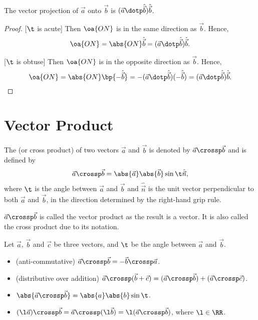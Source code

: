 \begin{proposition}
    The vector projection of $\vec a$ onto $\vec b$ is $(\vec a \dotp \hat{\vec b}) \hat{\vec b}$.
\end{proposition}
\begin{proof}
    [$\t$ is acute] Then $\oa{ON}$ is in the same direction as $\vec b$. Hence, \[\oa{ON} = \abs{ON} \hat{\vec b} = (\vec a \dotp \hat{\vec b}) \hat{\vec b}.\]

    [$\t$ is obtuse] Then $\oa{ON}$ is in the opposite direction as $\vec b$. Hence, \[\oa{ON} = \abs{ON} \bp{-\hat{\vec b}} = -(\vec a \dotp \hat{\vec b}) (-\hat{\vec b}) = (\vec a \dotp \hat{\vec b}) \hat{\vec b}.\]
\end{proof}

\section{Vector Product}

\begin{definition}
    The  (or cross product) of two vectors $\vec a$ and $\vec b$ is denoted by $\vec a \crossp \vec b$ and is defined by \[\vec a \crossp \vec b = \abs{\vec a}\abs{\vec b} \sin \t \hat{\vec n},\] where $\t$ is the angle between $\vec a$ and $\vec b$ and $\hat{\vec n}$ is the unit vector perpendicular to both $\vec a$ and $\vec b$, in the direction determined by the right-hand grip rule.
\end{definition}
\begin{remark}
    $\vec a \crossp \vec b$ is called the vector product as the result is a vector. It is also called the cross product due to its notation.
\end{remark}

\begin{fact}
    Let $\vec a$, $\vec b$ and $\vec c$ be three vectors, and $\t$ be the angle between $\vec a$ and $\vec b$.
    \begin{itemize}
        \item (anti-commutative) $\vec a \crossp \vec b = -\vec b \crossp \vec a$.
        \item (distributive over addition) $\vec a \crossp (\vec b + \vec c) = (\vec a \crossp \vec b) + (\vec a \crossp \vec c)$.
        \item $\abs{\vec a \crossp \vec b} = \abs{a} \abs{b} \sin \t$.
        \item $(\l \vec a) \crossp \vec b = \vec a \crossp (\l \vec b) = \l (\vec a \crossp \vec b)$, where $\l \in \RR$.
    \end{itemize}
\end{fact}

